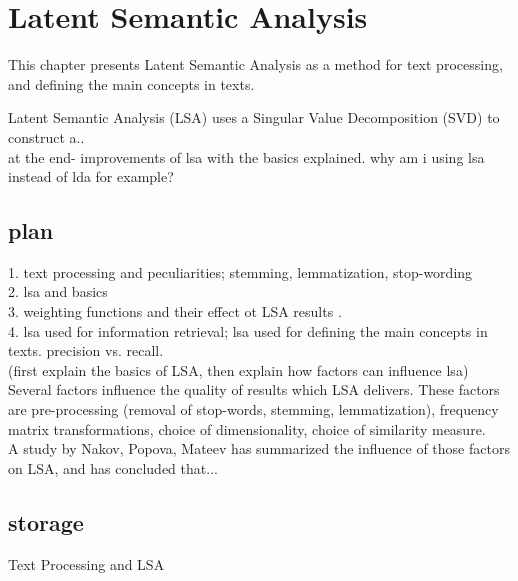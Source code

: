 \chapter{Latent Semantic Analysis}
\label{sec:lsa}

\begin{summary}
This chapter presents Latent Semantic Analysis as a method for text processing, and defining the main concepts in texts.
\end{summary}

Latent Semantic Analysis (LSA) uses a Singular Value Decomposition (SVD) to construct a..\\

at the end- improvements of lsa with the basics explained.
why am i using lsa instead of lda for example?
\section{plan}
\label{sec:lsa:plan}
1. text processing and peculiarities; stemming, lemmatization, stop-wording\\
2. lsa and basics\\
3. weighting functions and their effect ot LSA results \cite{Nakov_weightfunctions}. \\
4. lsa used for information retrieval; lsa used for defining the main concepts in texts. precision vs. recall. \\
(first explain the basics of LSA, then explain how factors can influence lsa)\\
Several factors influence the quality of results which LSA delivers. These factors are pre-processing (removal of stop-words, stemming, lemmatization), frequency matrix transformations, choice of dimensionality, choice of similarity measure.\\
A study by Nakov, Popova, Mateev\cite{Nakov_weightfunctions} has summarized the influence of those factors on LSA, and has concluded that...\\

\section{storage}
Text Processing and LSA\\

